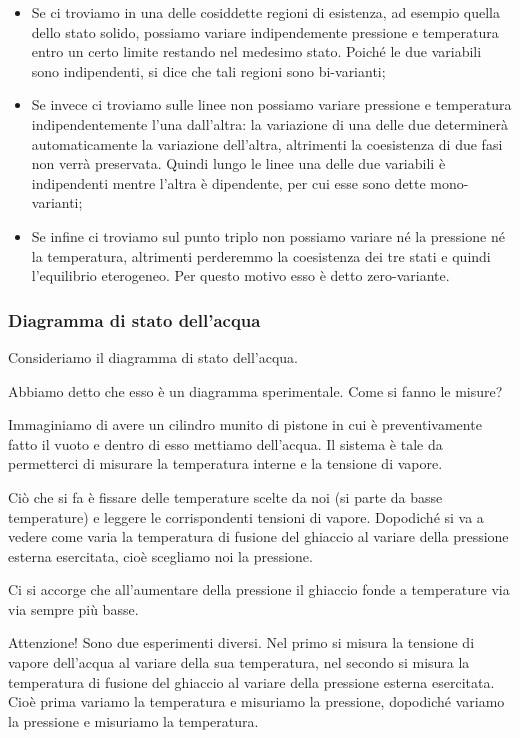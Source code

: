 \begin{itemize}
    \item Se ci troviamo in una delle cosiddette regioni di esistenza, ad esempio quella dello stato solido, possiamo variare indipendemente pressione e temperatura entro un certo limite restando nel medesimo stato. Poiché le due variabili sono indipendenti, si dice che tali regioni sono bi-varianti;
    \item Se invece ci troviamo sulle linee non possiamo variare pressione e temperatura indipendentemente l'una dall'altra: la variazione di una delle due determinerà automaticamente la variazione dell'altra, altrimenti la coesistenza di due fasi non verrà preservata. Quindi lungo le linee una delle due variabili è indipendenti mentre l'altra è dipendente, per cui esse sono dette mono-varianti;
    \item 
    Se infine ci troviamo sul punto triplo non possiamo variare né la pressione né la temperatura, altrimenti perderemmo la coesistenza dei tre stati e quindi l'equilibrio eterogeneo. Per questo motivo esso è detto zero-variante.
\end{itemize}

\subsubsection{Diagramma di stato dell'acqua}
Consideriamo il diagramma di stato dell'acqua.

Abbiamo detto che esso è un diagramma sperimentale. Come si fanno le misure?

Immaginiamo di avere un cilindro munito di pistone in cui è preventivamente fatto il vuoto e dentro di esso mettiamo dell'acqua. Il sistema è tale da permetterci di misurare la temperatura interne e la tensione di vapore.

Ciò che si fa è fissare delle temperature scelte da noi (si parte da basse temperature) e leggere le corrispondenti tensioni di vapore. Dopodiché si va a vedere come varia la temperatura di fusione del ghiaccio al variare della pressione esterna esercitata, cioè scegliamo noi la pressione.

Ci si accorge che all'aumentare della pressione il ghiaccio fonde a temperature via via sempre più basse.

Attenzione! Sono due esperimenti diversi. Nel primo si misura la tensione di vapore dell'acqua al variare della sua temperatura, nel secondo si misura la temperatura di fusione del ghiaccio al variare della pressione esterna esercitata. Cioè prima variamo la temperatura e misuriamo la pressione, dopodiché variamo la pressione e misuriamo la temperatura.

